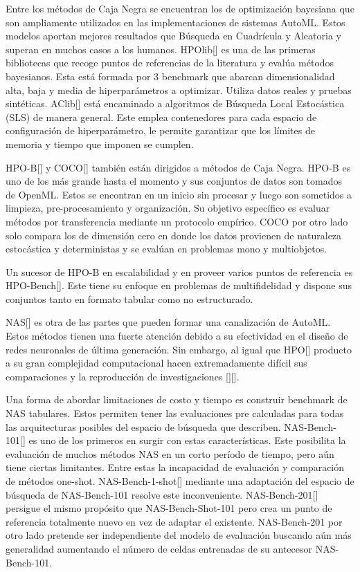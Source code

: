 Entre los métodos de Caja Negra se encuentran los de optimización bayesiana que son ampliamente utilizados en las implementaciones de sistemas AutoML. Estos modelos
aportan mejores resultados que Búsqueda en Cuadrícula y Aleatoria y superan en muchos casos a los humanos. HPOlib[\cite{63}] es una de las primeras 
bibliotecas que recoge puntos de referencias de la literatura y evalúa métodos bayesianos. Esta está formada por 3 benchmark que abarcan dimensionalidad alta, baja y 
media de hiperparámetros a optimizar. Utiliza datos reales y pruebas sintéticas. AClib[\cite{62}] está encaminado a algoritmos de Búsqueda Local Estocástica (SLS) 
de manera general. Este emplea contenedores para cada espacio de configuración de hiperparámetro, le permite garantizar que los límites de memoria y tiempo que imponen 
se cumplen. 

HPO-B[\cite{61}] y COCO[\cite{60}] también están dirigidos a métodos de Caja Negra. HPO-B es uno de los más grande hasta el momento y sus conjuntos de datos son 
tomados de OpenML. Estos se encontran en un inicio sin procesar y luego son sometidos a limpieza, pre-procesamiento y organización. 
Su objetivo específico es evaluar métodos por transferencia mediante un protocolo empírico. COCO por otro lado solo compara los de dimensión cero en donde los datos 
provienen de naturaleza estocástica y deterministas y se evalúan en problemas mono y multiobjetos.

Un sucesor de HPO-B en escalabilidad y en proveer varios puntos de referencia es HPO-Bench[\cite{50}]. Este tiene su enfoque en problemas de multifidelidad y 
dispone sus conjuntos tanto en formato tabular como no estructurado. 

NAS[\cite{35}] es otra de las partes que pueden formar una canalización de AutoML. Estos métodos tienen una fuerte atención debido a su efectividad en el diseño de 
redes neuronales de última generación. Sin embargo, al igual que HPO[\cite{35}] producto a su gran complejidad computacional hacen extremadamente difícil sus 
comparaciones y la reproducción de investigaciones [\cite{55}][\cite{59}].

Una forma de abordar limitaciones de costo y tiempo es construir benchmark de NAS tabulares. Estos permiten tener las evaluaciones 
pre calculadas para todas las arquitecturas posibles del espacio de búsqueda que describen. NAS-Bench-101[\cite{49}] es uno de los primeros en surgir con estas 
características. Este posibilita la evaluación de muchos métodos NAS en un corto período de tiempo, pero aún tiene ciertas limitantes. Entre estas la incapacidad de 
evaluación y comparación de métodos one-shot. NAS-Bench-1-shot[\cite{55}] mediante una adaptación del espacio de búsqueda de NAS-Bench-101 resolve este inconveniente. 
NAS-Bench-201[\cite{56}] persigue el mismo propósito que NAS-Bench-Shot-101 pero crea un punto de referencia totalmente nuevo en vez de adaptar el existente. 
NAS-Bench-201 por otro lado pretende ser independiente del modelo de evaluación buscando aún más generalidad aumentando el número de celdas entrenadas de su antecesor 
NAS-Bench-101.

